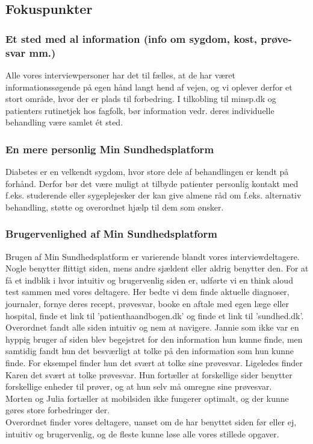 \subsection{Fokuspunkter}
\subsubsection{Et sted med al information (info om sygdom, kost, prøve-svar mm.)}
Alle vores interviewpersoner har det til fælles, at de har været informationssøgende på egen hånd langt hend af vejen, og vi oplever derfor et stort område, hvor der er plads til forbedring. I tilkobling til minsp.dk og patienters rutinetjek hos fagfolk, bør information vedr. deres individuelle behandling være samlet ét sted.

\subsubsection{En mere personlig Min Sundhedsplatform}
Diabetes er en velkendt sygdom, hvor store dele af behandlingen er kendt på forhånd. Derfor bør det være muligt at tilbyde patienter personlig kontakt med f.eks. studerende eller sygeplejesker der kan give almene råd om f.eks. alternativ behandling, støtte og overordnet hjælp til dem som ønsker.

\subsubsection{Brugervenlighed af Min Sundhedsplatform}
Brugen af Min Sundhedsplatform er varierende blandt vores interviewdeltagere. Nogle benytter flittigt siden, mens andre sjældent eller aldrig benytter den. For at få et indblik i hvor intuitiv og brugervenlig siden er, udførte vi en think aloud test sammen med vores deltagere. Her bedte vi dem finde aktuelle diagnoser, journaler, fornye deres recept, prøvesvar, booke en aftale med egen læge eller hospital, finde et link til 'patienthaandbogen.dk' og finde et link til 'sundhed.dk'. Overordnet fandt alle siden intuitiv og nem at navigere. Jannie som ikke var en hyppig bruger af siden blev begejstret for den information hun kunne finde, men samtidig fandt hun det besværligt at tolke på den information som hun kunne finde. For eksempel finder hun det svært at tolke sine prøvesvar. Ligeledes finder Karen det svært at tolke prøvesvar. Hun fortæller at forskellige sider benytter forskellige enheder til prøver, og at hun selv må omregne sine prøvesvar.\\
Morten og Julia fortæller at mobilsiden ikke fungerer optimalt, og der kunne gøres store forbedringer der.\\
Overordnet finder vores deltagere, uanset om de har benyttet siden før eller ej, intuitiv og brugervenlig, og de fleste kunne løse alle vores stillede opgaver.

